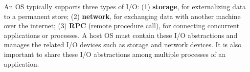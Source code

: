 \label{sec:abi:streams}



An OS typically supports three types of I/O:
(1) {\bf storage}, for externalizing data to a permanent store;
(2) {\bf network}, for exchanging data with another machine over the internet;
(3) {\bf RPC} (remote procedure call),
for connecting concurrent applications or processes.
A host OS must contain these I/O abstractions
and manages the related I/O devices such as storage and network devices.
It is also important to share these I/O abstractions
among multiple processes of an application.








